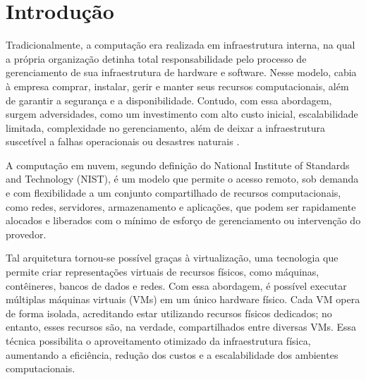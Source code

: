 %
%
%


\chapter{Introdução}
\label{sec:intro}

Tradicionalmente, a computação era realizada em infraestrutura interna, na qual a própria organização detinha total responsabilidade pelo processo de gerenciamento de sua infraestrutura de hardware e software. Nesse modelo, cabia à empresa comprar, instalar, gerir e manter seus recursos computacionais, além de garantir a segurança e a disponibilidade. Contudo, com essa abordagem, surgem adversidades, como um investimento com alto custo inicial, escalabilidade limitada, complexidade no gerenciamento, além de deixar a infraestrutura suscetível a falhas operacionais ou desastres naturais \cite{erecovery}. 

A computação em nuvem, segundo definição do National Institute of Standards and Technology  (NIST), é um modelo que permite o acesso remoto, sob demanda e com flexibilidade a um conjunto compartilhado de recursos computacionais, como redes, servidores, armazenamento e aplicações, que podem ser rapidamente alocados e liberados com o mínimo de esforço de gerenciamento ou intervenção do provedor\cite{nist2011}. 

Tal arquitetura tornou-se possível graças à virtualização, uma tecnologia que permite criar representações virtuais de recursos físicos, como máquinas, contêineres, bancos de dados e redes. Com essa abordagem, é possível executar múltiplas máquinas virtuais (VMs) em um único hardware físico. Cada VM opera de forma isolada, acreditando estar utilizando recursos físicos dedicados; no entanto, esses recursos são, na verdade, compartilhados entre diversas VMs. Essa técnica possibilita o aproveitamento otimizado da infraestrutura física, aumentando a eficiência, redução dos custos e a escalabilidade dos ambientes computacionais.  \cite{awsVirtualization}

